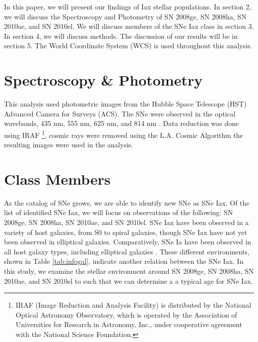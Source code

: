 \documentclass[preprint]{aastex}
\begin{document}
In this paper, we will present our findings of Iax stellar populations.
In section 2, we will discuss the Spectroscopy and Photometry of 
SN 2008ge, SN 2008ha, SN 2010ae, and SN 2010el.
We will discuss members of the SNe Iax class in section 3. 
In section 4, we will discuss methods.
The discussion of our results will be in section 5. 
The World Coordinate System (WCS) is used throughout this analysis. 

\section{Spectroscopy \& Photometry}

This analysis used photometric images from the Hubble Space Telescope (HST) 
Advanced Camera for Surveys (ACS).
The SNe were observed in the optical wavebands, 435 nm, 555 nm, 625 nm, and 814 nm . 
Data reduction was done using IRAF \footnote{IRAF (Image Reduction and Analysis Facility)
 is distributed by the National
Optical Astronomy Observatory, which is operated by the Association
of Universities for Research in Astronomy, Inc., under cooperative agreement
with the National Science Foundation.},  cosmic rays were removed using the 
L.A. Cosmic Algorithm %
the resulting images were used in the analysis. 

\section{Class Members}
As the catalog of SNe grows, we are able to identify new SNe as SNe Iax.
Of the list of identified SNe Iax, we will focus on observations of the following:  
SN 2008ge, SN 2008ha, SN 2010ae, and SN 2010el. %
SNe Iax have been observed in a variety of host galaxies, from S0 to spiral galaxies, 
though SNe Iax have not yet been observed in elliptical galaxies\citep{fol09}. 
Comparatively, SNe Ia have been observed in all host galaxy types, 
including elliptical galaxies \citep{van92}.
These different environments, shown in Table \ref{tab:infogal}, indicate another relation between the SNe Iax. 
In this study, we examine the stellar environment around
SN 2008ge, SN 2008ha, SN 2010ae, and SN 2010el to 
such that we can determine a a typical age for SNe Iax. 
\end{document}
